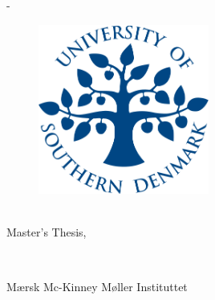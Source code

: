 \begin{titlingpage}
	\thispagestyle{empty}
	\enlargethispage{1.3cm}
	\calccentering{\unitlength}
	\begin{adjustwidth}{\unitlength}{-\unitlength}
		\vspace*{-1.9cm}
		\begin{figure} %
			\centering
			\includegraphics[width=0.5\textwidth]{figures/front_matter/SDU2013_SDU_Logo}
		\end{figure}

		\begin{raggedright}
			\begin{Spacing}{1.2}
				{\sffamily\HUGE\textbf{\ThTitleEN}\\[1.5cm]}
				{\sffamily\LARGE{Master's Thesis, \ThEndDate}\\[2cm]}
			\end{Spacing}
			{\Huge\sffamily\ThAuthors\\[2cm]}
		\end{raggedright}
		\begin{raggedright}
			\sffamily\LARGE{Mærsk Mc-Kinney Møller Instituttet}
		\end{raggedright}
	\end{adjustwidth}


\end{titlingpage}
